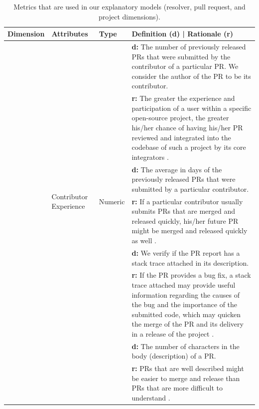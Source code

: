 \begin{table}[htbp]
	\caption{Metrics that are used in our explanatory models (resolver, pull request, and project dimensions).}
	\footnotesize
	\begin{tabular}{|>{\centering\arraybackslash}m{0.45in}|m{0.60in}|m{0.4in}|m{2.5in}|}
		\hline
		\textbf{Dimension} & \textbf{Attributes} & \textbf{Type} & \textbf{Definition (d) | Rationale (r)} \\ \hline
		\multirow{12}{*}{Resolver} & \multirow{7}{2cm}{Contributor Experience}
		& \multirow{7}{*}{Numeric} & \textbf{d:} The number of
		previously released PRs that were submitted by the contributor of a
		particular PR. We consider the author of the PR to be its
		contributor. \\ \cline{4-4}
		& &  & \textbf{r:} The greater
		the experience and participation of a user within a specific
		open-source project, the greater his/her chance of having
		his/her PR reviewed and integrated into the codebase of such a project
		by its core integrators \citep{shihab2010predicting}.   \\
		\cline{ 2- 4}
		
		& \multirow{5}{2cm}{Contributor Integration} & \multirow{5}{*}{Numeric} & \textbf{d:} The average in days of the previously released PRs that were submitted by
		a particular contributor.
		\\ \cline{4-4}
		& &  & \textbf{r:} If a particular contributor usually submits PRs that are merged and released quickly, his/her future PR might be merged and released quickly as well \citep{Da_Costa2016-cb}.  \\ \hline
		
		
		\multirow{11}{1.2cm}{Pull Request} & \multirow{6}{2cm}{Stack Trace Attached} & \multirow{6}{*}{Boolean} & \textbf{d:} We verify if the PR report has a stack trace attached in its description. \\ \cline{4-4}
		& &  & \textbf{r:} 
		If the PR provides a bug fix, a stack trace attached may provide useful information regarding the causes of the bug and the importance of the submitted code, which may quicken the merge of the PR and its delivery in a release of the project \citep{schroter2010stack}.\\ \cline{ 2- 4}
		& \multirow{4}{1.5cm}{Description Size} & \multirow{4}{*}{Numeric} & \textbf{d:} The number of characters in the body (description) of a PR.
		\\ \cline{4-4}
		& &  & \textbf{r:} PRs that are well described might be easier to merge and release than PRs that are more difficult to understand  \citep{Da_Costa2016-cb}.
		\\ \hline
		

\end{tabular}
\end{table}

